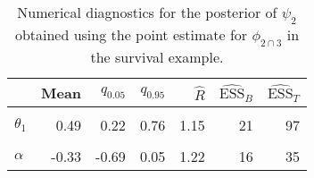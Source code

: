 \begin{table}

\caption{Numerical diagnostics for the posterior of $\psi_{2}$ obtained using the point estimate for $\phi_{2 \cap 3}$ in the survival example.}
\centering
\begin{tabular}[t]{lrrrrrr}
\toprule
  & Mean & $q_{0.05}$ & $q_{0.95}$ & $\widehat{R}$ & $\widehat{\text{ESS}}_{B}$ & $\widehat{\text{ESS}}_{T}$\\
\midrule
\cellcolor{gray!6}{$\theta_{0}$} & \cellcolor{gray!6}{0.61} & \cellcolor{gray!6}{-0.44} & \cellcolor{gray!6}{1.67} & \cellcolor{gray!6}{1.24} & \cellcolor{gray!6}{15} & \cellcolor{gray!6}{76}\\
$\theta_{1}$ & 0.49 & 0.22 & 0.76 & 1.15 & 21 & 97\\
\cellcolor{gray!6}{$\gamma$} & \cellcolor{gray!6}{16.30} & \cellcolor{gray!6}{14.33} & \cellcolor{gray!6}{18.15} & \cellcolor{gray!6}{1.15} & \cellcolor{gray!6}{21} & \cellcolor{gray!6}{65}\\
$\alpha$ & -0.33 & -0.69 & 0.05 & 1.22 & 16 & 35\\
\bottomrule
\end{tabular}
\end{table}